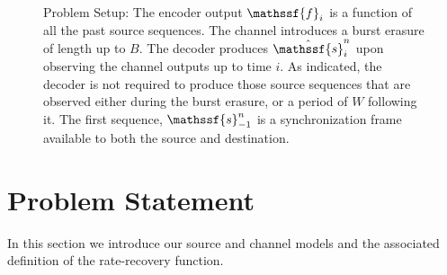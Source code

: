 \documentclass[journal, twocolumn, 10pt]{IEEEtran}
\newcommand{\rvf}{{\mathssf{f}}}    %
\newcommand{\rvs}{{\mathssf{s}}}    %
\begin{document}
\begin{figure}
\begin{center}

\caption{ Problem Setup: The encoder output $\rvf_i$ is a  function of  all the past source sequences.
The channel introduces a burst erasure of length up to $B$.
The decoder produces $\hat{\rvs}_i^n $ upon observing the  channel outputs up to time $i$.  
As indicated, the decoder is not required to produce those source sequences that are observed either during the burst erasure, or a period of $W$ 
following it. The first sequence, $\rvs_{-1}^n$ is a synchronization frame available to both the source and destination.}
\label{fig:setup}
\end{center}
\end{figure}


\section{Problem Statement}
\label{sec:statement}
In this section we introduce our source and channel models and the associated definition of the rate-recovery function. 
\end{document}
